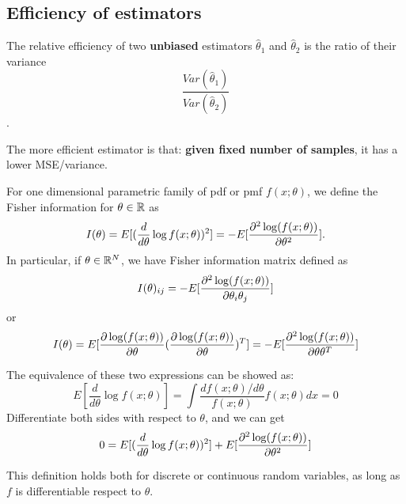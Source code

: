 \begin{refsection}
\subsection{Efficiency of estimators}
\begin{definition}
The relative efficiency of two \textbf{unbiased} estimators $\hat{\theta}_1$ and $\hat{\theta}_2$ is the ratio of their variance $$\frac{Var(\hat{\theta}_1)}{Var(\hat{\theta}_2)}$$.
\end{definition}

\begin{remark}
The more efficient estimator is that: \textbf{given fixed number of samples}, it has a lower MSE/variance. 
\end{remark}

\begin{definition}
For one dimensional parametric family of pdf or pmf $f(x;\theta)$, we define the Fisher information for $\theta\in \mathbb{R}$ as
$$I(\theta) = E[(\frac{d}{d\theta}\log f(x;\theta))^2] = -E[\frac{\partial^2 \log(f(x;\theta))}{\partial \theta^2}].$$
In particular, if $\theta \in \mathbb{R}^N$, we have Fisher information matrix defined as
$$I(\theta)_{ij} =-E[\frac{\partial^2 \log(f(x;\theta))}{\partial \theta_i\theta_j}] $$ or 
$$I(\theta) = E[\frac{\partial \log(f(x;\theta))}{\partial \theta}(\frac{\partial \log(f(x;\theta))}{\partial \theta})^T] = -E[\frac{\partial^2 \log(f(x;\theta))}{\partial \theta\theta^T}]$$
\end{definition}

\begin{remark}
The equivalence of these two expressions can be showed as:
$$E[\frac{d}{d\theta} \log f(x;\theta)] = \int \frac{df(x;\theta)/d\theta}{f(x;\theta)} f(x;\theta) dx = 0$$
Differentiate both sides with respect to $\theta$, and we can get
$$ 0 = E[(\frac{d}{d\theta}\log f(x;\theta))^2] + E[\frac{\partial^2 \log(f(x;\theta))}{\partial \theta^2}]$$
\end{remark}


\begin{remark}
This definition holds both for discrete or continuous random variables, as long as $f$  is differentiable respect to $\theta$. 
\end{remark}


\end{refsection}

